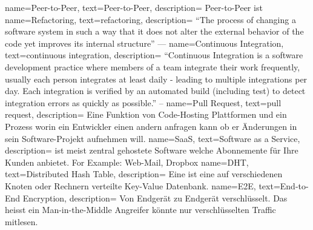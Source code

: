\makeglossaries
                 { name={Peer-to-Peer},                  text={Peer-to-Peer},           description={{
    Peer-to-Peer ist
}}}
         { name={Refactoring},                   text={refactoring},            description={{
    ``The process of changing a software system in such a way that it does
        not alter the external behavior of the code yet improves its internal
        structure'' ---\cite{Fowler2018}
}}}
                  { name={Continuous Integration},        text={continuous integration}, description={{
    ``Continuous Integration is a software development practice where members
    of a team integrate their work frequently,                                 usually each person integrates
    at least daily - leading to multiple integrations per day. Each integration
    is verified by an automated build (including test) to detect integration
    errors as quickly as possible.'' -- \cite{Fowler2014}
}}}
                  { name={Pull Request},                  text={pull request},           description={{
    Eine Funktion von Code-Hosting Plattformen und ein Prozess worin ein Entwickler einen andern anfragen kann ob er Änderungen in sein Software-Projekt aufnehmen will.
}}}
                { name={SaaS},                          text={Software as a Service},  description={{
             ist meist zentral gehostete Software welche Abonnemente für Ihre Kunden anbietet.
    For Example: Web-Mail, Dropbox
}}}
                 { name={DHT},        text={Distributed Hash Table},                    description={{
    Eine  ist eine auf verschiedenen Knoten oder Rechnern verteilte Key-Value Datenbank.
}}}
                 { name={E2E},        text={End-to-End Encryption},                     description={{
    Von Endgerät zu Endgerät verschlüsselt. Das heisst ein Man-in-the-Middle Angreifer könnte nur verschlüsselten Traffic mitlesen.
}}}
